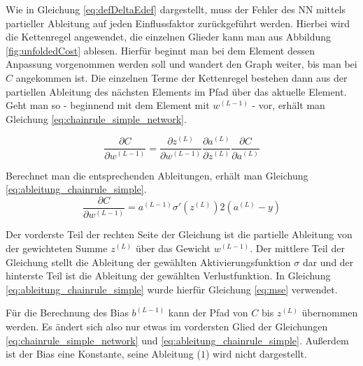 
Wie in Gleichung \ref{eq:defDeltaEdef} dargestellt, muss der Fehler des \ac{NN} mittels partieller Ableitung auf jeden Einflussfaktor zurückgeführt werden. Hierbei wird die Kettenregel angewendet, die einzelnen Glieder kann man aus Abbildung \ref{fig:unfoldedCost} ablesen. Hierfür beginnt man bei dem Element dessen Anpassung vorgenommen werden soll und wandert den Graph weiter, bis man bei $C$ angekommen ist. Die einzelnen Terme der Kettenregel bestehen dann aus der partiellen Ableitung des nächsten Elements im Pfad über das aktuelle Element. Geht man so - beginnend mit dem Element mit $w^{(L-1)}$ - vor, erhält man Gleichung \ref{eq:chainrule_simple_network}.

\begin{equation} \label{eq:chainrule_simple_network}
    \frac{\partial C }{\partial w^{(L-1)}} =  
    \frac{\partial z^{(L)} }{\partial w^{(L-1)}}
    \frac{\partial a^{(L)} }{\partial z^{(L)}}
    \frac{\partial C }{\partial a^{(L)}}
\end{equation}

Berechnet man die entsprechenden Ableitungen, erhält man Gleichung \ref{eq:ableitung_chainrule_simple}.
\begin{equation} \label{eq:ableitung_chainrule_simple}
    \frac{\partial C }{\partial w^{(L-1)}} = 
    a^{(L-1)} \sigma'(z^{(L)})
    2(a^{(L)}-y)
\end{equation}

Der vorderste Teil der rechten Seite der Gleichung ist die partielle Ableitung von der gewichteten Summe $z^{(L)}$ über das Gewicht $w^{(L-1)}$. Der mittlere Teil der Gleichung stellt die Ableitung der gewählten Aktivierungsfunktion $\sigma$ dar und der hinterste Teil ist die Ableitung der gewählten Verlustfunktion. In Gleichung \ref{eq:ableitung_chainrule_simple} wurde hierfür Gleichung \ref{eq:mse} verwendet.

Für die Berechnung des Bias $b^{(L-1)}$ kann der Pfad von $C$ bis $z^{(L)}$ übernommen werden. Es ändert sich also nur etwas im vordersten Glied der Gleichungen \ref{eq:chainrule_simple_network} und \ref{eq:ableitung_chainrule_simple}. Außerdem ist der Bias eine Konstante, seine Ableitung ($1$)  wird nicht dargestellt.

